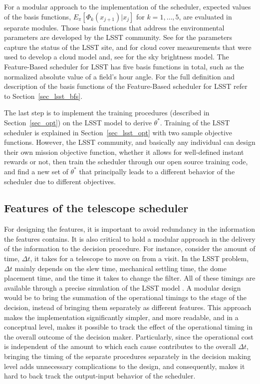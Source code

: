 \documentclass[12pt]{aastex62}
\theoremstyle{definition}
\begin{document}
For a modular approach to the implementation of the scheduler, expected values of the basis functions, $E_{\pi}[\Phi_k(x_{j+1})|x_j]$ for $k=1,\dots, 5$, are evaluated in separate modules. Those basis functions that address the environmental parameters are developed by the LSST community. See \citep{2014SPIE.9145E..1AG} for the parameters capture the status of the LSST site, \citep{sebag2008lsst} and \citep{sebag2007lsst} for cloud cover measurements that were used to develop a cloud model and, see \citep{yoachim2016optical} for the sky brightness model. The Feature-Based scheduler for LSST has five basis functions in total, such as the normalized absolute value of a field's hour angle. For the full definition and description of the basis functions of the Feature-Based scheduler for LSST refer to Section~\ref{sec_lsst_bfs}.

The last step is to implement the training procedures (described in Section~\ref{sec_opt}) on the LSST model to derive $\theta^*$. Training of the LSST scheduler is explained in Section~\ref{sec_lsst_opt} with two sample objective functions. However, the LSST community, and basically any individual can design their own mission objective function, whether it allows for well-defined instant rewards or not, then train the scheduler through our open source training code, and find a new set of $\theta^*$ that principally leads to a different behavior of the scheduler due to different objectives.


\subsection{Features of the telescope scheduler}\label{sec_lsst_features}

For designing the features, it is important to avoid redundancy in the information the features contains. It is also critical to hold a modular approach in the delivery of the information to the decision procedure. For instance, consider the amount of time, $\Delta t$, it takes for a telescope to move on from a visit. In the LSST problem, $\Delta t$ mainly depends on the slew time, mechanical settling time, the dome placement time, and the time it takes to change the filter. All of these timings are available through a precise simulation of the LSST model \citep{delgado2014lsst}. A modular design would be to bring the summation of the operational timings to the stage of the decision, instead of bringing them separately as different features. This approach makes the implementation significantly simpler, and more readable, and in a conceptual level, makes it possible to track the effect of the operational timing in the overall outcome of the decision maker. Particularly, since the operational cost is independent of the amount to which each cause contributes to the overall $\Delta t$, bringing the timing of the separate procedures separately in the decision making level adds unnecessary complications to the design, and consequently, makes it hard to back track the output-input behavior of the scheduler. 
\end{document}
